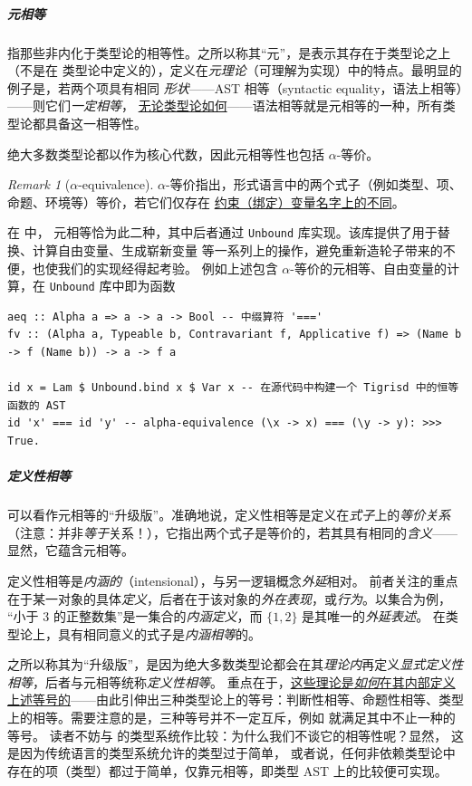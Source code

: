 \documentclass[a4paper, 11pt]{article}
\theoremstyle{remark}\newtheorem*{remark}{Remark}
\theoremstyle{definition}\newtheorem*{definition}{Definition}
\begin{document}
\subparagraph{元相等}指那些非内化于类型论的相等性。之所以称其“元”，是表示其存在于类型论之上（不是在
类型论中定义的），定义在\emph{元理论}（可理解为实现）中的特点。最明显的例子是，若两个项具有相同
\emph{形状}——AST 相等（syntactic equality，语法上相等）——则它们\emph{一定相等}，
\underline{无论类型论如何}——语法相等就是元相等的一种，所有类型论都具备这一相等性。

绝大多数类型论都以\lambdacalc 作为核心代数，因此元相等性也包括 $\alpha$-等价。
\begin{remark}[$\alpha$-equivalence]
$\alpha$-等价指出，形式语言中的两个式子（例如类型、项、命题、环境等）等价，若它们仅存在
\underline{约束（绑定）变量名字上的不同}。
\end{remark}
在 \Tigrisd 中，
元相等恰为此二种，其中后者通过 \texttt{Unbound} 库实现。该库提供了用于替换、计算自由变量、生成崭新变量
等一系列\lambdacalc 上的操作，避免重新造轮子带来的不便，也使我们的实现经得起考验。
例如上述包含 $\alpha$-等价的元相等、自由变量的计算，在 \texttt{Unbound} 库中即为函数
\begin{verbatim}
aeq :: Alpha a => a -> a -> Bool -- 中缀算符 '==='
fv :: (Alpha a, Typeable b, Contravariant f, Applicative f) => (Name b -> f (Name b)) -> a -> f a

id x = Lam $ Unbound.bind x $ Var x -- 在源代码中构建一个 Tigrisd 中的恒等函数的 AST
id 'x' === id 'y' -- alpha-equivalence (\x -> x) === (\y -> y): >>> True.
\end{verbatim}

\subparagraph{定义性相等}可以看作元相等的“升级版”。准确地说，定义性相等是定义在\emph{式子}上的\emph{等价关系}（注意：并非\emph{等于}关系！），它指出两个式子是等价的，若其具有相同的\emph{含义}——
显然，它蕴含元相等。

定义性相等是\emph{内涵的}（intensional），与另一逻辑概念\emph{外延}相对。
前者关注的重点在于某一对象的具体\emph{定义}，后者在于该对象的\emph{外在表现}，或\emph{行为}。以集合为例，
“小于 3 的正整数集”是一集合的\emph{内涵定义}，而 $\{1,2\}$ 是其唯一的\emph{外延表述}。
在类型论上，具有相同意义的式子是\emph{内涵相等}的。

之所以称其为“升级版”，是因为绝大多数类型论都会在其\emph{理论内}再定义\emph{显式定义性相等}，后者与元相等统称\emph{定义性相等}。
重点在于，\underline{这些理论是\emph{如何}在其内部定义上述等号的}——由此引伸出三种类型论上的等号：判断性相等、命题性相等、类型上的相等。需要注意的是，三种等号并不一定互斥，例如 \Tigrisd 就满足其中不止一种的等号。
读者不妨与 \Tigris 的类型系统作比较：为什么我们不谈它的相等性呢？显然，
这是因为传统语言的类型系统允许的类型过于简单，
或者说，任何非依赖类型论中存在的项（类型）都过于简单，仅靠元相等，即类型 AST 上的比较便可实现。
\end{document}
